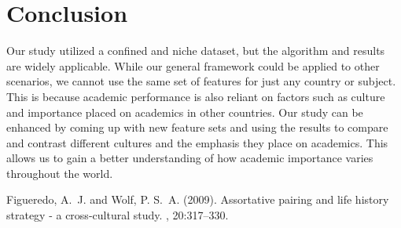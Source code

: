 \documentclass[twoside,twocolumn]{article}
\begin{document}

\section{Conclusion}
Our study utilized a confined and niche dataset, but the algorithm and results are widely applicable. While our general framework could be applied to other scenarios, we cannot use the same set of features for just any country or subject. This is because academic performance is also reliant on factors such as culture and importance placed on academics in other countries. Our study can be enhanced by coming up with new feature sets and using the results to compare and contrast different cultures and the emphasis they place on academics. This allows us to gain a better understanding of how academic importance varies throughout the world.


\begin{thebibliography}{99} %

Figueredo, A.~J. and Wolf, P. S.~A. (2009).
\newblock Assortative pairing and life history strategy - a cross-cultural
  study.
, 20:317--330.
 
\end{thebibliography}

\end{document}
